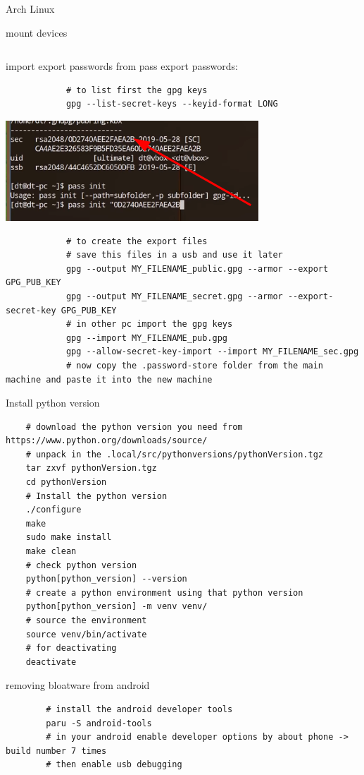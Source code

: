 \begin{section}{Arch Linux}
\begin{subsection}{mount devices}
\begin{verbatim}
		\end{verbatim}
	\end{subsection}
	\newpage
	\begin{subsection}{import export passwords from pass}
		export passwords:
		\begin{verbatim}
			# to list first the gpg keys
			gpg --list-secret-keys --keyid-format LONG
		\end{verbatim}
		\includegraphics{img_ArchLinux/publicKeyImage.png}
		\begin{verbatim}
			# to create the export files
			# save this files in a usb and use it later
			gpg --output MY_FILENAME_public.gpg --armor --export GPG_PUB_KEY
			gpg --output MY_FILENAME_secret.gpg --armor --export-secret-key GPG_PUB_KEY
			# in other pc import the gpg keys
			gpg --import MY_FILENAME_pub.gpg
			gpg --allow-secret-key-import --import MY_FILENAME_sec.gpg
			# now copy the .password-store folder from the main machine and paste it into the new machine
		\end{verbatim}


	\end{subsection}

	\begin{section}{Install python version}
		\begin{verbatim}
	# download the python version you need from https://www.python.org/downloads/source/
	# unpack in the .local/src/pythonversions/pythonVersion.tgz
	tar zxvf pythonVersion.tgz
	cd pythonVersion
	# Install the python version
	./configure
	make
	sudo make install
	make clean
	# check python version
	python[python_version] --version
	# create a python environment using that python version
	python[python_version] -m venv venv/
	# source the environment
	source venv/bin/activate
	# for deactivating
	deactivate
		\end{verbatim}
	\end{section}

	\begin{subsection}{removing bloatware from android}
	
		\begin{verbatim}
		# install the android developer tools
		paru -S android-tools
		# in your android enable developer options by about phone -> build number 7 times
		# then enable usb debugging


\end{verbatim}
\end{subsection}
\end{section}
